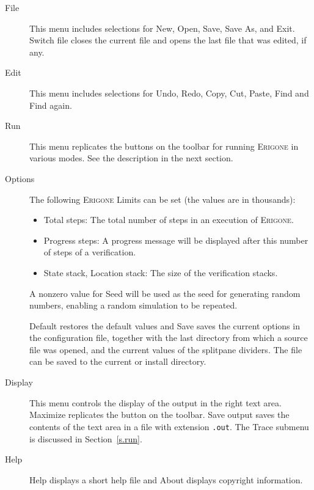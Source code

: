\documentclass[11pt]{article}
\newcommand{\eri}{\textsc{Erigone}}
\newcommand{\p}[1]{\texttt{#1}}
\newcommand{\bu}[1]{\textsf{#1}}
\begin{document}
\begin{description}
\item[\bu{File}] This menu includes selections for \bu{New}, \bu{Open}, 
\bu{Save}, \bu{Save As}, and \bu{Exit}. \bu{Switch file} closes the 
current file and opens the last file that was edited, if any.

\item[\bu{Edit}] This menu includes selections for \bu{Undo}, \bu{Redo}, 
\bu{Copy}, \bu{Cut}, \bu{Paste}, \bu{Find} and \bu{Find again}.

\item[\bu{Run}] This menu replicates the buttons on the toolbar for
running \eri{} in various modes. See the description in the next
section.

\item[\bu{Options}] The following \eri{} \bu{Limits} can be set (the
values are in thousands):
\begin{itemize}
\item \bu{Total steps}: The total number of steps in an execution of
\eri{}.
\item \bu{Progress steps}: A progress message will be displayed
after this number of steps of a verification.
\item \bu{State stack}, \bu{Location stack}: The size of the
verification stacks.
\end{itemize}

A nonzero value for \bu{Seed} will be used as the seed for generating
random numbers, enabling a random simulation to be repeated.

\bu{Default} restores the default values and \bu{Save} saves the current
options in the configuration file, together with the last directory from
which a source file was opened, and the current values of the splitpane
dividers. The file can be saved to the \bu{current} or \bu{install}
directory.

\item[\bu{Display}] This menu controls the display of the output in the
right text area. \bu{Maximize} replicates the button on the toolbar.
\bu{Save output} saves the contents of the text area in a file with
extension \p{.out}. The \bu{Trace} submenu is discussed in
Section~\ref{s.run}.

\item[\bu{Help}] \bu{Help} displays a short help file and \bu{About} 
displays copyright information.
\end{description}
\end{document}

